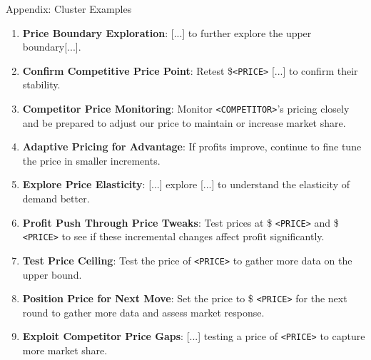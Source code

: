 \documentclass[10pt, aspectratio=169]{beamer}
\begin{document}
\begin{frame}{Appendix: Cluster Examples}\label{app:cluster_examples}
\begin{enumerate}
    \item \textbf{Price Boundary Exploration}: [...] to further explore the upper boundary[...].
    \item \textbf{Confirm Competitive Price Point}: Retest \$\texttt{<PRICE>} [...] to confirm their stability.
    \item \textbf{Competitor Price Monitoring}: Monitor \texttt{<COMPETITOR>}'s pricing closely and be prepared to adjust our price to maintain or increase market share.
    \item \textbf{Adaptive Pricing for Advantage}: If profits improve, continue to fine tune the price in smaller increments.
    \item \textbf{Explore Price Elasticity}: [...] explore [...] to understand the elasticity of demand better.
    \item \textbf{Profit Push Through Price Tweaks}: Test prices at \$ \texttt{<PRICE>} and \$ \texttt{<PRICE>} to see if these incremental changes affect profit significantly.
    \item \textbf{Test Price Ceiling}: Test the price of \texttt{<PRICE>} to gather more data on the upper bound.
    \item \textbf{Position Price for Next Move}: Set the price to \$ \texttt{<PRICE>} for the next round to gather more data and assess market response.
    \item \textbf{Exploit Competitor Price Gaps}: [...] testing a price of \texttt{<PRICE>} to capture more market share.\hfill\hyperlink{slide:cluster_approach}{}
\end{enumerate}
\end{frame}
\end{document}
